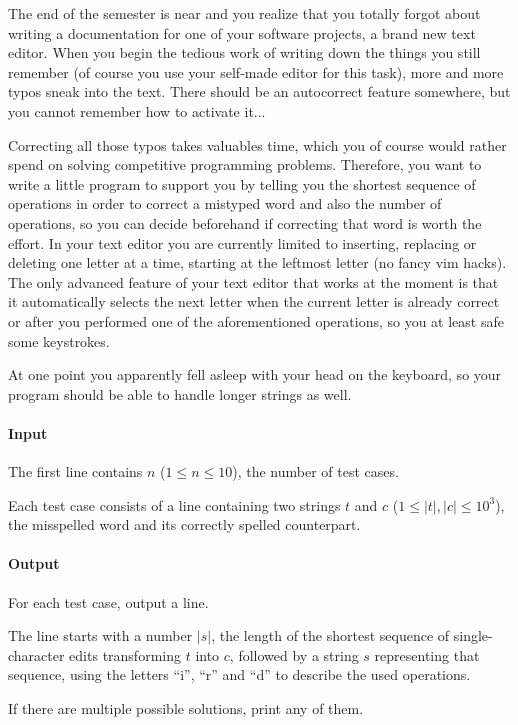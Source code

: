 




The end of the semester is near and you realize that you totally forgot about writing a documentation for one of your software projects, a brand new text editor. When you begin the tedious work of writing down the things you still remember (of course you use your self-made editor for this task), more and more typos sneak into the text. There should be an autocorrect feature somewhere, but you cannot remember how to activate it...

Correcting all those typos takes valuables time, which you of course would rather spend on solving competitive programming problems. Therefore, you want to write a little program to support you by telling you the shortest sequence of operations in order to correct a mistyped word and also the number of operations, so you can decide beforehand if correcting that word is worth the effort. In your text editor you are currently limited to inserting, replacing or deleting one letter at a time, starting at the leftmost letter (no fancy vim hacks). The only advanced feature of your text editor that works at the moment is that it automatically selects the next letter when the current letter is already correct or after you performed one of the aforementioned operations, so you at least safe some keystrokes.

At one point you apparently fell asleep with your head on the keyboard, so your program should be able to handle longer strings as well.

\paragraph*{Input}

The first line contains $n$ ($1 \leq n \leq 10$), the number of test cases.

Each test case consists of a line containing two strings $t$ and $c$ ($1 \leq |t|, |c| \leq 10^3$), the misspelled word and its correctly spelled counterpart.

\paragraph*{Output}

For each test case, output a line.

The line starts with a number $|s|$, the length of the shortest sequence of single-character edits transforming $t$ into $c$, followed by a string $s$ representing that sequence, using the letters ``i'', ``r'' and ``d'' to describe the used operations.

If there are multiple possible solutions, print any of them.

\begin{samples}[1.5] %
\end{samples}



